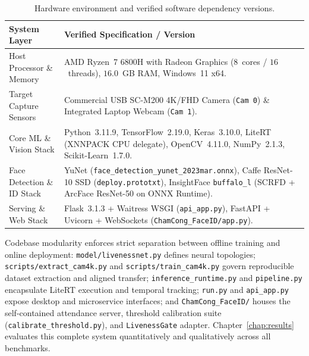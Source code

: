 \begin{table}[htbp]
\centering
\caption{Hardware environment and verified software dependency versions.}
\label{tab:software_stack}
\small
\begin{tabular}{L{3.8cm}L{10.4cm}}
\toprule
\textbf{System Layer} & \textbf{Verified Specification / Version} \\
\midrule
Host Processor \& Memory & AMD Ryzen~7 6800H with Radeon Graphics ($8$~cores / $16$~threads), $16.0$~GB RAM, Windows~11 x64. \\
Target Capture Sensors & Commercial USB SC-M200 4K/FHD Camera (\texttt{Cam 0}) \& Integrated Laptop Webcam (\texttt{Cam 1}). \\
Core ML \& Vision Stack & Python~3.11.9, TensorFlow~2.19.0, Keras~3.10.0, LiteRT (XNNPACK CPU delegate), OpenCV~4.11.0, NumPy~2.1.3, Scikit-Learn~1.7.0. \\
Face Detection \& ID Stack & YuNet (\texttt{face\_detection\_yunet\_2023mar.onnx}), Caffe ResNet-10 SSD (\texttt{deploy.prototxt}), InsightFace \texttt{buffalo\_l} (SCRFD + ArcFace ResNet-50 on ONNX Runtime). \\
Serving \& Web Stack & Flask~3.1.3 + Waitress WSGI (\texttt{api\_app.py}), FastAPI + Uvicorn + WebSockets (\texttt{ChamCong\_FaceID/app.py}). \\
\bottomrule
\end{tabular}
\end{table}

Codebase modularity enforces strict separation between offline training and online deployment: \texttt{model/livenessnet.py} defines neural topologies; \texttt{scripts/extract\_cam4k.py} and \texttt{scripts/train\_cam4k.py} govern reproducible dataset extraction and aligned transfer; \texttt{inference\_runtime.py} and \texttt{pipeline.py} encapsulate LiteRT execution and temporal tracking; \texttt{run.py} and \texttt{api\_app.py} expose desktop and microservice interfaces; and \texttt{ChamCong\_FaceID/} houses the self-contained attendance server, threshold calibration suite (\texttt{calibrate\_threshold.py}), and \texttt{LivenessGate} adapter. Chapter~\ref{chap:results} evaluates this complete system quantitatively and qualitatively across all benchmarks.
